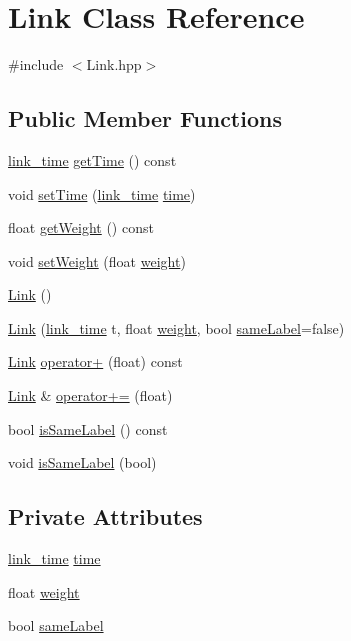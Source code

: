 \hypertarget{class_link}{\section{Link Class Reference}
\label{class_link}
}


{\ttfamily \#include $<$Link.\+hpp$>$}

\subsection*{Public Member Functions}
\begin{DoxyCompactItemize}
\item 
\hyperlink{_link_8hpp_aaf44f94a2cc67ec8ddd81004137e8369}{link\+\_\+time} \hyperlink{class_link_af3dac01ac8fb3c9d9637361bab37a8f7}{get\+Time} () const 
\item 
void \hyperlink{class_link_af8b4ae699e66876e9fe933b0d979838f}{set\+Time} (\hyperlink{_link_8hpp_aaf44f94a2cc67ec8ddd81004137e8369}{link\+\_\+time} \hyperlink{class_link_acb992140e3cf154c36fd94ab8184e00e}{time})
\item 
float \hyperlink{class_link_aaf7980526f4edf059b27602a7be82b2a}{get\+Weight} () const 
\item 
void \hyperlink{class_link_add219a5edb1c6a97ae46f5f1ab360a22}{set\+Weight} (float \hyperlink{class_link_a61f8b4a76aa028011dbe75affc1b44f7}{weight})
\item 
\hyperlink{class_link_a1918a8473cee40bbed17b8e926cb85d9}{Link} ()
\item 
\hyperlink{class_link_ae744492cec1a0e4dac79070ab7beb3d3}{Link} (\hyperlink{_link_8hpp_aaf44f94a2cc67ec8ddd81004137e8369}{link\+\_\+time} t, float \hyperlink{class_link_a61f8b4a76aa028011dbe75affc1b44f7}{weight}, bool \hyperlink{class_link_ae5f10e1961b948c4a5e71e6702c68de0}{same\+Label}=false)
\item 
\hyperlink{class_link}{Link} \hyperlink{class_link_ae3cc4f9078e2f6f1b642667d49b9dc02}{operator+} (float) const 
\item 
\hyperlink{class_link}{Link} \& \hyperlink{class_link_a71e54bce5f5f7244144c7f7cf4b826a6}{operator+=} (float)
\item 
bool \hyperlink{class_link_a1eaa1a41eb1bcc0563786d60d7eb45c0}{is\+Same\+Label} () const 
\item 
void \hyperlink{class_link_a8270edfed8ba5ace14c55393282cf77a}{is\+Same\+Label} (bool)
\end{DoxyCompactItemize}
\subsection*{Private Attributes}
\begin{DoxyCompactItemize}
\item 
\hyperlink{_link_8hpp_aaf44f94a2cc67ec8ddd81004137e8369}{link\+\_\+time} \hyperlink{class_link_acb992140e3cf154c36fd94ab8184e00e}{time}
\item 
float \hyperlink{class_link_a61f8b4a76aa028011dbe75affc1b44f7}{weight}
\item 
bool \hyperlink{class_link_ae5f10e1961b948c4a5e71e6702c68de0}{same\+Label}
\end{DoxyCompactItemize}
